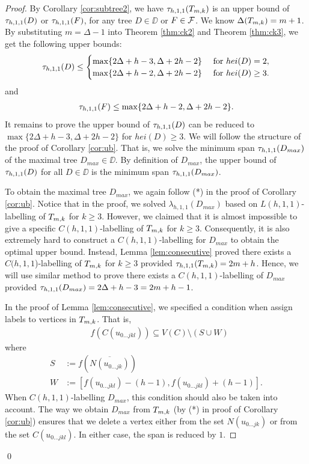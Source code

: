 \begin{proof}
By Corollary \ref{cor:subtree2}, we have $\tau_{h,1,1}(T_{m,k})$ is an upper bound of $\tau_{h,1,1}(D)$ or $\tau_{h,1,1}(F)$, for any tree $D \in \DD$ or $F \in {\cal F}$. We know $\Delta(T_{m,k}) = m+1$. By substituting $m = \Delta-1$ into Theorem \ref{thm:ck2} and Theorem \ref{thm:ck3}, we get the following upper bounds: 
\begin{align*}
\tau_{h,1,1}(D) \le 
 \begin{cases}
 \max\{2\Delta+h-3, \Delta+2h-2\} & \text{ for } hei(D) =2, \\
 \max\{2\Delta+h-2, \Delta+2h-2\} & \text{ for } hei(D) \ge 3.
 \end{cases}
\end{align*}
and 
\begin{align*}
\tau_{h,1,1}(F) \le \max\{2\Delta+h-2, \Delta+2h-2\}.
\end{align*}
It remains to prove the upper bound of $\th11(D)$ can be reduced to $\max\{2\Delta+h-3, \Delta+2h-2\}$ for $hei(D) \ge 3$. We will follow the structure of the proof of Corollary \ref{cor:ub}. That is, we solve the minimum span $\tau_{h,1,1}(D_{max})$ of the maximal tree $D_{max} \in \DD$. By definition of $D_{max}$, the upper bound of $\tau_{h,1,1}(D)$ for all $D \in \DD$ is the minimum span $\tau_{h,1,1}(D_{max})$.

To obtain the maximal tree $D_{max}$, we again follow (*) in the proof of Corollary \ref{cor:ub}. Notice that in the proof, we solved $\lambda_{h,1,1}(D_{max})$ based on $L(h,1,1)$-labelling of $T_{m,k}$ for $k \ge 3$. However, we claimed that it is almost impossible to give a specific $C(h,1,1)$-labelling of $T_{m,k}$ for $k \ge 3$. Consequently, it is also extremely hard to construct a $C(h,1,1)$-labelling for $D_{max}$ to obtain the optimal upper bound. Instead, Lemma \ref{lem:consecutive} proved there exists a $C(h,1,1$)-labelling of $T_{m,k}$ for $k \ge 3$ provided $\th11(\tmk) = 2m+h$. Hence, we will use similar method to prove there exists a $C(h,1,1)$-labelling of $D_{max}$ provided $\th11(D_{max}) = 2\Delta+h-3=2m+h-1$. 

In the proof of Lemma \ref{lem:consecutive}, we specified a condition when assign labels to vertices in $T_{m,k}$. That is, 
\begin{align*}
&f(C(u_{0\dots jkl})) \subseteq V(C) \setminus (S \cup W)
\end{align*}  
where 
\begin{align*}
S &:= f(\overline{N(u_{0\dots jk})}) \\
W &:= [f(u_{0\dots jkl}) - (h-1), f(u_{0\dots jkl}) + (h-1)].
\end{align*}
When $C(h,1,1)$-labelling $D_{max}$, this condition should also be taken into account. The way we obtain $D_{max}$ from $T_{m,k}$ (by (*) in proof of Corollary \ref{cor:ub}) ensures that we delete a vertex either from the set $N(u_{0\dots jk})$ or from the set $C(u_{0\dots jkl})$. In either case, the span is reduced by $1$.
\end{proof}
\qed

